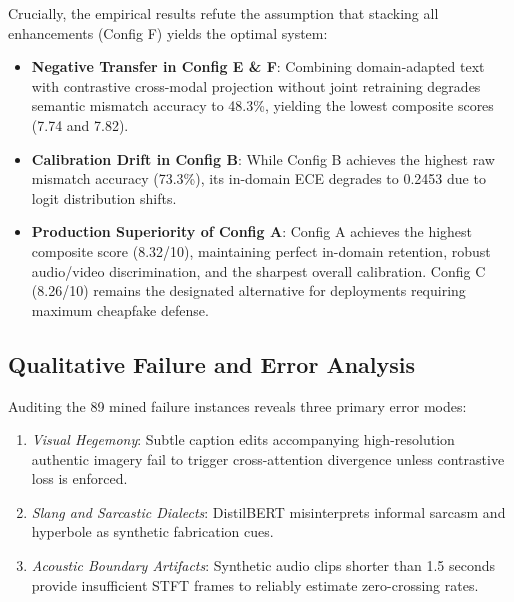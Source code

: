 \documentclass[conference]{IEEEtran}
\begin{document}
Crucially, the empirical results refute the assumption that stacking all enhancements (Config F) yields the optimal system:
\begin{itemize}
    \item \textbf{Negative Transfer in Config E \& F}: Combining domain-adapted text with contrastive cross-modal projection without joint retraining degrades semantic mismatch accuracy to 48.3\%, yielding the lowest composite scores (7.74 and 7.82).
    \item \textbf{Calibration Drift in Config B}: While Config B achieves the highest raw mismatch accuracy (73.3\%), its in-domain ECE degrades to 0.2453 due to logit distribution shifts.
    \item \textbf{Production Superiority of Config A}: Config A achieves the highest composite score (8.32/10), maintaining perfect in-domain retention, robust audio/video discrimination, and the sharpest overall calibration. Config C (8.26/10) remains the designated alternative for deployments requiring maximum cheapfake defense.
\end{itemize}

\subsection{Qualitative Failure and Error Analysis}
Auditing the 89 mined failure instances reveals three primary error modes:
\begin{enumerate}
    \item \textit{Visual Hegemony}: Subtle caption edits accompanying high-resolution authentic imagery fail to trigger cross-attention divergence unless contrastive loss is enforced.
    \item \textit{Slang and Sarcastic Dialects}: DistilBERT misinterprets informal sarcasm and hyperbole as synthetic fabrication cues.
    \item \textit{Acoustic Boundary Artifacts}: Synthetic audio clips shorter than 1.5 seconds provide insufficient STFT frames to reliably estimate zero-crossing rates.
\end{enumerate}
\end{document}
